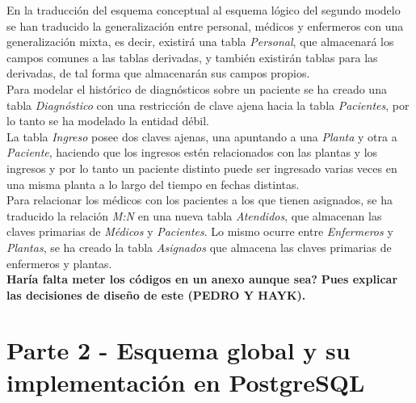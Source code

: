 \documentclass{article}
\begin{document}
En la traducción del esquema conceptual al esquema lógico del segundo modelo se han traducido la generalización entre personal, médicos y enfermeros con una generalización mixta, es decir, existirá una tabla \emph{Personal}, que almacenará los campos comunes a las tablas derivadas, y también existirán tablas para las derivadas, de tal forma que almacenarán sus campos propios.\\
Para modelar el histórico de diagnósticos sobre un paciente se ha creado una tabla \emph{Diagnóstico} con una restricción de clave ajena hacia la tabla \emph{Pacientes}, por lo tanto se ha modelado la entidad débil.\\
La tabla \emph{Ingreso} posee dos claves ajenas, una apuntando a una \emph{Planta} y otra a \emph{Paciente}, haciendo que los ingresos estén relacionados con las plantas y los ingresos y por lo tanto un paciente distinto puede ser ingresado varias veces en una misma planta a lo largo del tiempo en fechas distintas.\\
Para relacionar los médicos con los pacientes a los que tienen asignados, se ha traducido la relación \emph{M:N} en una nueva tabla \emph{Atendidos}, que almacenan las claves primarias de \emph{Médicos} y \emph{Pacientes}. Lo mismo ocurre entre \emph{Enfermeros} y \emph{Plantas}, se ha creado la tabla \emph{Asignados} que almacena las claves primarias de enfermeros y plantas.\\


\textbf{Haría falta meter los códigos en un anexo aunque sea?}
\textbf{Pues explicar las decisiones de diseño de este (PEDRO Y HAYK).}

\section{Parte 2 - Esquema global y su implementación en PostgreSQL}
\end{document}
